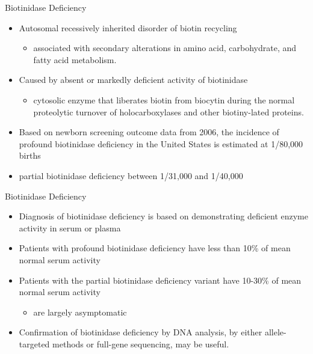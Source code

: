 \documentclass[presentation, smaller]{beamer}
\begin{document}
\begin{frame}[label={sec:orgheadline1}]{Biotinidase Deficiency}
\begin{itemize}
\item Autosomal recessively inherited disorder of biotin recycling
\begin{itemize}
\item associated with secondary alterations in amino acid, carbohydrate,
and fatty acid metabolism.
\end{itemize}
\item Caused by absent or markedly deficient activity of biotinidase
\begin{itemize}
\item cytosolic enzyme that liberates biotin from biocytin during the
normal proteolytic turnover of holocarboxylases and other
biotiny-lated proteins.
\end{itemize}

\item Based on newborn screening outcome data from 2006, the incidence of
profound biotinidase deficiency in the United States is estimated at
1/80,000 births
\item partial biotinidase deficiency between 1/31,000 and 1/40,000
\end{itemize}
\end{frame}

\begin{frame}[label={sec:orgheadline2}]{Biotinidase Deficiency}
\begin{itemize}
\item Diagnosis of biotinidase deficiency is based on demonstrating
deficient enzyme activity in serum or plasma

\item Patients with profound biotinidase deficiency have less than 10\% of
mean normal serum activity

\item Patients with the partial biotinidase deficiency variant have 10-30\%
of mean normal serum activity
\begin{itemize}
\item are largely asymptomatic
\end{itemize}

\item Confirmation of biotinidase deficiency by DNA analysis, by either
allele-targeted methods or full-gene sequencing, may be useful.
\end{itemize}
\end{frame}
\end{document}
